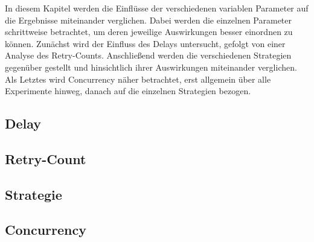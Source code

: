 
In diesem Kapitel werden die Einflüsse der verschiedenen variablen Parameter auf die Ergebnisse miteinander verglichen.
Dabei werden die einzelnen Parameter schrittweise betrachtet, um deren jeweilige Auswirkungen besser einordnen zu
können.
Zunächst wird der Einfluss des Delays untersucht, gefolgt von einer Analyse des Retry-Counts.
Anschließend werden die verschiedenen Strategien gegenüber gestellt und hinsichtlich ihrer Auswirkungen miteinander
verglichen.
Als Letztes wird Concurrency näher betrachtet, erst allgemein über alle Experimente hinweg, danach auf die
einzelnen Strategien bezogen.

\subsection{Delay}
\label{subsec:d}


\subsection{Retry-Count}
\label{subsec:r}


\subsection{Strategie}
\label{subsec:s}


\subsection{Concurrency}
\label{subsec:cc}

